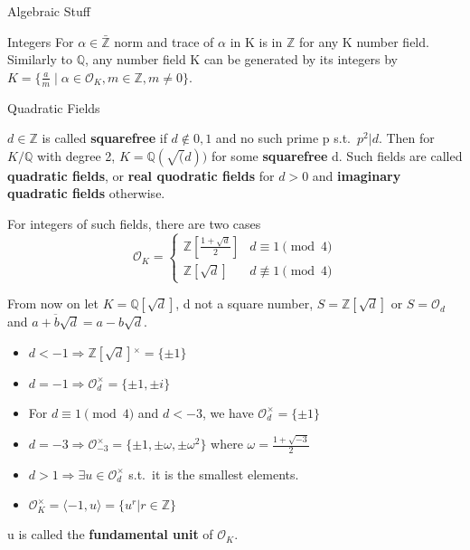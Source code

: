 \documentclass[12pt, letterpaper]{article}
\newcommand{\Q}{\mathbb{Q}}
\newcommand{\Z}{\mathbb{Z}}
\newcommand{\Ok}{\mathcal{O}}
\begin{document}
\begin{section}{Algebraic Stuff}
\begin{subsection}{Integers}
    For \(\alpha \in \bar{\Z}\) norm and trace of \(\alpha\) in K is
    in \(\Z\) for any K number field. \\
    Similarly to \(\Q\), any number field K can be generated by its
    integers by \(K = \{\frac{a}{m} \; | \; \alpha \in \Ok_{K}, m \in
    \Z, m \neq 0\}\).

  \end{subsection}

  \begin{subsection}{Quadratic Fields}

    \(d \in \Z\) is called \textbf{squarefree} if \(d \notin {0, 1}\)
    and no such prime p s.t.\ \(p^{2} | d\). Then for \(K / \Q\) with
    degree 2, \(K = \Q(\sqrt(d))\) for some \textbf{squarefree} d. Such
    fields are called \textbf{quadratic fields}, or \textbf{real quodratic
      fields} for \(d > 0\) and \textbf{imaginary quadratic fields} otherwise.

    For integers of such fields, there are two cases
    \[\Ok_{K} =
      \begin{cases}
        \Z[\frac{1 + \sqrt{d}}{2}] & d \equiv 1 \pmod{4} \\
        \Z[\sqrt{d}] & d \not\equiv 1 \pmod{4}
       \end{cases}
     \]

     From now on let \(K = \Q[\sqrt{d}]\), d not a square number,
     \(S = \Z[\sqrt{d}]\) or \(S = \Ok_{d}\) and
     \(\overline{a + b \sqrt{d}} = a - b \sqrt{d}\). \\
     \begin{itemize}
       \item \(d < -1 \Rightarrow \Z[\sqrt{d}]{}^{\times} =
             \{ \pm 1 \}\)
       \item \(d = -1 \Rightarrow \Ok_{d}^{\times} = \{ \pm 1, \pm
             i \}\)
       \item For \(d \equiv 1 \pmod{4}\) and \(d < -3\), we have
             \(\Ok_{d}^{\times} = \{ \pm 1 \}\)
       \item \(d = -3 \Rightarrow \Ok_{-3}^{\times} = \{ \pm 1, \pm
             \omega, \pm \omega^{2} \}\) where \(\omega = \frac{1 +
             \sqrt{-3}}{2}\)
       \item \(d > 1 \Rightarrow \exists u \in \Ok_{d}^{\times}\) s.t.\
             it is the smallest elements.
       \item \(\Ok_{K}^{\times} = \langle -1, u \rangle =
             \{ u^{r} | r \in \Z \}\)
     \end{itemize}
     u is called the \textbf{fundamental unit} of \(\Ok_{K}\).


\end{subsection}
\end{section}
\end{document}
